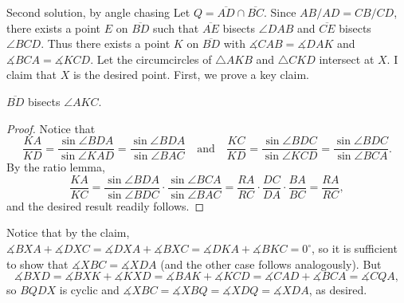 \begin{customenv}{Second solution, by angle chasing}
    Let $Q=\overline{AD}\cap\overline{BC}$. Since $AB/AD=CB/CD$, there exists a point $E$ on $\overline{BD}$ such that $\overline{AE}$ bisects $\angle DAB$ and $\overline{CE}$ bisects $\angle BCD$. Thus there exists a point $K$ on $\overline{BD}$ with $\measuredangle CAB=\measuredangle DAK$ and $\measuredangle BCA=\measuredangle KCD$. Let the circumcircles of $\triangle AKB$ and $\triangle CKD$ intersect at $X$. I claim that $X$ is the desired point. First, we prove a key claim.
    \begin{iclaim*}
        $\overline{BD}$ bisects $\angle AKC$.
    \end{iclaim*}
    \begin{proof}
        Notice that \[\frac{KA}{KD}=\frac{\sin\angle BDA}{\sin\angle KAD}=\frac{\sin\angle BDA}{\sin\angle BAC}\quad\text{and}\quad\frac{KC}{KD}=\frac{\sin\angle BDC}{\sin\angle KCD}=\frac{\sin \angle BDC}{\sin\angle BCA}.\]
        By the ratio lemma, \[\frac{KA}{KC}=\frac{\sin\angle BDA}{\sin\angle BDC}\cdot\frac{\sin\angle BCA}{\sin\angle BAC}=\frac{RA}{RC}\cdot\frac{DC}{DA}\cdot\frac{BA}{BC}=\frac{RA}{RC},\]
        and the desired result readily follows.
    \end{proof}

    Notice that by the claim, $\measuredangle BXA+\measuredangle DXC=\measuredangle DXA+\measuredangle BXC=\measuredangle DKA+\measuredangle BKC=0^\circ$, so it is sufficient to show that $\measuredangle XBC=\measuredangle XDA$ (and the other case follows analogously). But \[\measuredangle BXD=\measuredangle BXK+\measuredangle KXD=\measuredangle BAK+\measuredangle KCD=\measuredangle CAD+\measuredangle BCA=\measuredangle CQA,\]
    so $BQDX$ is cyclic and $\measuredangle XBC=\measuredangle XBQ=\measuredangle XDQ=\measuredangle XDA$, as desired.
\end{customenv}

